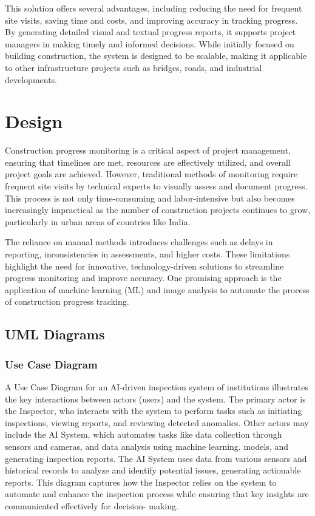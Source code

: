 \documentclass[12pt,a4paper]{report}
\begin{document}
This solution offers several advantages, including reducing the need for frequent site visits, saving time and costs, and improving accuracy in tracking progress. By generating detailed visual and textual progress reports, it supports project managers in making timely and informed decisions. While initially focused on building construction, the system is designed to be scalable, making it applicable to other infrastructure projects such as bridges, roads, and industrial developments.



\chapter{Design}

Construction progress monitoring is a critical aspect of project management, ensuring that timelines are met, resources are effectively utilized, and overall project goals are achieved. However, traditional methods of monitoring require frequent site visits by technical experts to visually assess and document progress. This process is not only time-consuming and labor-intensive but also becomes increasingly impractical as the number of construction projects continues to grow, particularly in urban areas of countries like India.

The reliance on manual methods introduces challenges such as delays in reporting, inconsistencies in assessments, and higher costs. These limitations highlight the need for innovative, technology-driven solutions to streamline progress monitoring and improve accuracy. One promising approach is the application of machine learning (ML) and image analysis to automate the process of construction progress tracking.

\section{UML Diagrams}
\subsection{Use Case Diagram}
A Use Case Diagram for an AI-driven inspection system of institutions illustrates the key interactions between actors (users) and the system. The primary actor is the Inspector, who interacts with the system to perform tasks such as initiating inspections, viewing reports, and reviewing detected anomalies. Other actors may include the AI System, which automates tasks like data collection through sensors and cameras, and data analysis using machine learning.
models, and generating inspection reports. The AI System uses data from various sensors and historical records to analyze and identify potential issues, generating actionable reports. This diagram captures how the Inspector relies on the system to automate and enhance the 
inspection process while ensuring that key insights are communicated effectively for decision- making.
\end{document}

